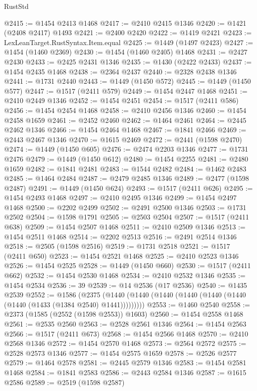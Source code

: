 \begin{lexlean}{RustStd}
\begin{coremodule}
@2415 := @1454 @2413 @1468
@2417 := @2410 @2415 @1346
@2420 := @1421 (@2408 @2417) @1493
@2421 := @2400 @2420
@2422 := @1419 @2421
@2423 := LexLeanTarget.RustSyntax.Item.equal
@2425 := @1449 (@1497 @2423)
@2427 := @1454 (@1460 @2369)
@2430 := @1454 (@1460 @2405) @1468
@2431 := @2427 @2430
@2433 := @2425 @2431 @1346
@2435 := @1430 (@2422 @2433)
@2437 := @1454 @2435 @1468
@2438 := @2364 @2437
@2440 := @2328 @2438 @1346
@2441 := @1731 @2440
@2443 := @1449 (@1450 @572)
@2445 := @1449 (@1450 @577)
@2447 := @1517 (@2411 @579)
@2449 := @1454 @2447 @1468
@2451 := @2410 @2449 @1346
@2452 := @1454 @2451
@2454 := @1517 (@2411 @586)
@2456 := @1454 @2454 @1468
@2458 := @2410 @2456 @1346
@2460 := @1454 @2458 @1659
@2461 := @2452 @2460
@2462 := @1464 @2461
@2464 := @2445 @2462 @1346
@2466 := @1454 @2464 @1468
@2467 := @1841 @2466
@2469 := @2443 @2467 @1346
@2470 := @1615 @2469
@2472 := @2441 (@1598 @2470)
@2474 := @1449 (@1450 @605)
@2476 := @2474 @2203 @1346
@2477 := @1731 @2476
@2479 := @1449 (@1450 @612)
@2480 := @1454 @2255
@2481 := @2480 @1659
@2482 := @1841 @2481
@2483 := @1544 @2482
@2484 := @1462 @2483
@2485 := @1464 @2484
@2487 := @2479 @2485 @1346
@2489 := @2477 (@1598 @2487)
@2491 := @1449 (@1450 @624)
@2493 := @1517 (@2411 @626)
@2495 := @1454 @2493 @1468
@2497 := @2410 @2495 @1346
@2499 := @1454 @2497 @1468
@2500 := @2202 @2499
@2502 := @2491 @2500 @1346
@2503 := @1731 @2502
@2504 := @1598 @1791
@2505 := @2503 @2504
@2507 := @1517 (@2411 @638)
@2509 := @1454 @2507 @1468
@2511 := @2410 @2509 @1346
@2513 := @1454 @2511 @1468
@2514 := @2202 @2513
@2516 := @2491 @2514 @1346
@2518 := @2505 (@1598 @2516)
@2519 := @1731 @2518
@2521 := @1517 (@2411 @650)
@2523 := @1454 @2521 @1468
@2525 := @2410 @2523 @1346
@2526 := @1454 @2525
@2528 := @1449 (@1450 @660)
@2530 := @1517 (@2411 @662)
@2532 := @1454 @2530 @1468
@2534 := @2410 @2532 @1346
@2535 := @1454 @2534
@2536 := 39
@2539 := @14 @2536 (@17 @2536)
@2540 := @1435 @2539
@2552 := @1586
    (@2375 (@1440 (@1440 (@1440 (@1440 (@1440 (@1440 (@1440 (@1433 (@1384 @2540) @1441)))))))))
@2553 := @1460 @2540
@2558 := @2373 (@1585 (@2552 (@1598 @2553)) @1603)
@2560 := @1454 @2558 @1468
@2561 := @2535 @2560
@2563 := @2528 @2561 @1346
@2564 := @1454 @2563
@2566 := @1517 (@2411 @673)
@2568 := @1454 @2566 @1468
@2570 := @2410 @2568 @1346
@2572 := @1454 @2570 @1468
@2573 := @2564 @2572
@2575 := @2528 @2573 @1346
@2577 := @1454 @2575 @1659
@2578 := @2526 @2577
@2579 := @1464 @2578
@2581 := @2445 @2579 @1346
@2583 := @1454 @2581 @1468
@2584 := @1841 @2583
@2586 := @2443 @2584 @1346
@2587 := @1615 @2586
@2589 := @2519 (@1598 @2587)

\end{coremodule}
\end{lexlean}
